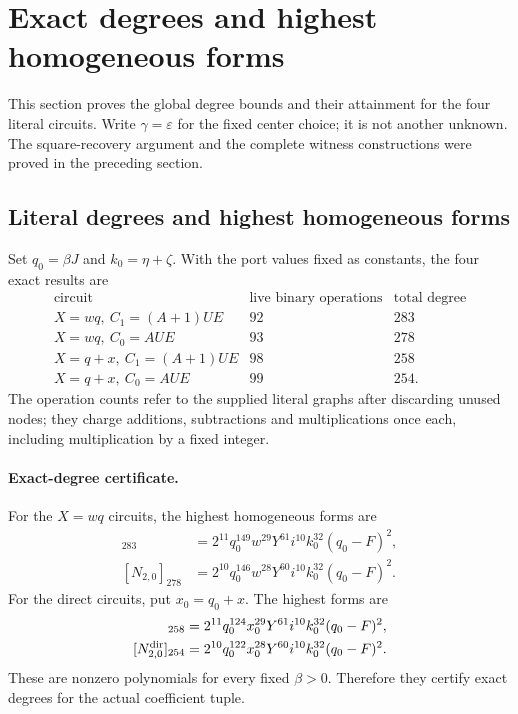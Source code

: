 \section{Exact degrees and highest homogeneous forms}
\label{sec:saturated-two-root}

This section proves the global degree bounds and their attainment for
the four literal circuits.  Write $\gamma=\varepsilon$ for the fixed
center choice; it is not another unknown.  The square-recovery argument
and the complete witness constructions were proved in the preceding
section.

\subsection{Literal degrees and highest homogeneous forms}

Set $q_0=\beta J$ and $k_0=\eta+\zeta$.  With the port values fixed
as constants, the four exact results are
\[
\begin{array}{c|r|r}
\text{circuit}&\text{live binary operations}&\text{total degree}\\\hline
 X=wq,\ C_1=(A+1)UE&92&283\\
 X=wq,\ C_0=AUE&93&278\\
 X=q+x,\ C_1=(A+1)UE&98&258\\
 X=q+x,\ C_0=AUE&99&254.
\end{array}
\]
The operation counts refer to the supplied literal graphs after
discarding unused nodes; they charge additions, subtractions and
multiplications once each, including multiplication by a fixed integer.

\paragraph{Exact-degree certificate.}
For the $X=wq$ circuits, the highest homogeneous forms are
\begin{align*}
 [N_{2,1}]_{283}
   &=2^{11}q_0^{149}w^{29}Y^{61}i^{10}k_0^{32}(q_0-F)^2,\\
 [N_{2,0}]_{278}
   &=2^{10}q_0^{146}w^{28}Y^{60}i^{10}k_0^{32}(q_0-F)^2.
\end{align*}
For the direct circuits, put $x_0=q_0+x$.  The highest forms are
\begin{align*}
 [N_{2,1}^{\rm dir}]_{258}
   &=2^{11}q_0^{124}x_0^{29}Y^{61}i^{10}k_0^{32}(q_0-F)^2,\\
 [N_{2,0}^{\rm dir}]_{254}
   &=2^{10}q_0^{122}x_0^{28}Y^{60}i^{10}k_0^{32}(q_0-F)^2.
\end{align*}
These are nonzero polynomials for every fixed $\beta>0$.  Therefore
they certify exact degrees for the actual coefficient tuple.

